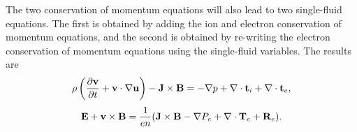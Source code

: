 \documentclass[oneside,a4paper,11pt]{report}
\begin{document}
The two conservation of momentum equations will also lead to two single-fluid equations. The first is obtained by adding the ion and electron conservation of momentum equations, and the second is obtained by re-writing the electron conservation of momentum equations using the single-fluid variables. The results are
\begin{equation}
\label{eq:generalized_MHD_vel}
    \rho \left (\frac{\partial \mathbf{v}}{\partial t} + \mathbf{v} \cdot \nabla \mathbf{u} \right) - \mathbf{J} \times \mathbf{B} = -\nabla p + \nabla \cdot \mathbf{t}_i + \nabla \cdot \mathbf{t}_e,
\end{equation}
\begin{equation}
\label{eq:generalized_MHD_ohms}
    \mathbf{E} + \mathbf{v} \times \mathbf{B} = \frac{1}{en} ( \mathbf{J} \times \mathbf{B} - \nabla P_e + \nabla \cdot \mathbf{T}_e + \mathbf{R}_e).
\end{equation}
\end{document}
